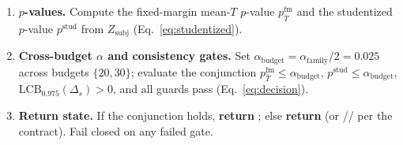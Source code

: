 \begin{center}
{\begin{minipage}{0.92\textwidth}
\begin{enumerate}
        replicates.
  \item \textbf{$p$-values.} Compute the fixed-margin mean-$T$ $p$-value $p^{\text{fm}}_{\bar T}$ and the
        studentized $p$-value $p^{\text{stud}}$ from $Z_{\mathrm{subj}}$ (Eq.~\ref{eq:studentized}).
  \item \textbf{Cross-budget $\alpha$ and consistency gates.} Set
        $\alpha_{\text{budget}}=\alpha_{\text{family}}/2=0.025$ across budgets $\{20,30\}$; evaluate the
        conjunction $p^{\text{fm}}_{\bar T}\le\alpha_{\text{budget}}$, $p^{\text{stud}}\le\alpha_{\text{budget}}$,
        $\mathrm{LCB}_{0.975}(\Delta_s)>0$, and all guards pass (Eq.~\ref{eq:decision}).
  \item \textbf{Return state.} If the conjunction holds, \textbf{return} \stconf{}; else \textbf{return}
        \stnoev{} (or \stneed{}/\stinv{}/\stunid{} per the contract). Fail closed on any failed gate.
\end{enumerate}
\end{minipage}}
\end{center}
